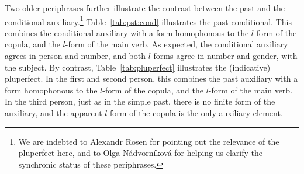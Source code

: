 \documentclass[output=paper]{langsci/langscibook}
\begin{document}
\begin{table}
\caption{Present conditional subparadigm of \textsc{\v{c}ekat} ‘wait’ \label{tab:prs:cond} }
\end{table}


Two older periphrases further illustrate the contrast between the past and the conditional auxiliary.\footnote{We are indebted to Alexandr Rosen for pointing out the relevance of the pluperfect here, and to Olga Nádvorníková for helping us clarify the synchronic status of these periphrases.} Table~\ref{tab:pst:cond} illustrates the past conditional.  This combines the conditional auxiliary with a form homophonous to the $l$-form of the copula, and the $l$-form of the main verb. As expected, the conditional auxiliary agrees in person and number, and both $l$-forms agree in number and gender, with the subject. By contrast, Table~\ref{tab:pluperfect} illustrates the (indicative) pluperfect. In the first and second person, this combines the past auxiliary with a form homophonous to the $l$-form of the copula, and the $l$-form of the main verb. In the third person, just as in the simple past, there is no finite form of the auxiliary, and the apparent $l$-form of the copula is the only auxiliary element.
\end{document}
